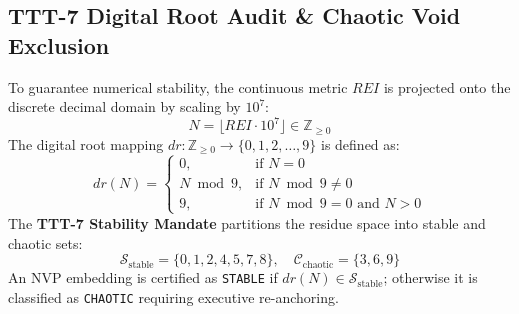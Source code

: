 \subsection{TTT-7 Digital Root Audit \& Chaotic Void Exclusion}
To guarantee numerical stability, the continuous metric $REI$ is projected onto the discrete decimal domain by scaling by $10^7$:
\begin{equation}
    N = \lfloor REI \cdot 10^7 \rfloor \in \mathbb{Z}_{\ge 0}
\end{equation}
The digital root mapping $dr: \mathbb{Z}_{\ge 0} \to \{0, 1, 2, \dots, 9\}$ is defined as:
\begin{equation}
    dr(N) = \begin{cases}
        0, & \text{if } N = 0 \\
        N \bmod 9, & \text{if } N \bmod 9 \neq 0 \\
        9, & \text{if } N \bmod 9 = 0 \text{ and } N > 0
    \end{cases}
\end{equation}
The \textbf{TTT-7 Stability Mandate} partitions the residue space into stable and chaotic sets:
\begin{equation}
    \mathcal{S}_{\text{stable}} = \{0, 1, 2, 4, 5, 7, 8\}, \quad \mathcal{C}_{\text{chaotic}} = \{3, 6, 9\}
\end{equation}
An NVP embedding is certified as \texttt{STABLE} if $dr(N) \in \mathcal{S}_{\text{stable}}$; otherwise it is classified as \texttt{CHAOTIC} requiring executive re-anchoring.
